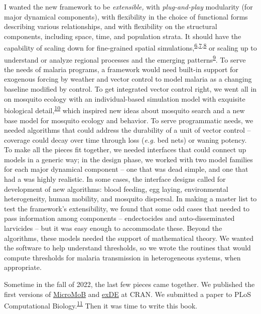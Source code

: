 \documentclass[
]{book}
\begin{document}
I wanted the new framework to be \emph{extensible,} with \emph{plug-and-play} modularity (for major dynamical components), with flexibility in the choice of functional forms describing various relationships, and with flexibility on the structural components, including space, time, and population strata.
It should have the capability of scaling down for fine-grained spatial simulations,\textsuperscript{\protect\hyperlink{ref-CarterR2002SpatialSimulation}{6},\protect\hyperlink{ref-GuW2003IndividualbasedModel}{7},\protect\hyperlink{ref-PerkinsTA2013HeterogeneityMixing}{8}} or scaling up to understand or analyze regional processes and the emerging patterns\textsuperscript{\protect\hyperlink{ref-TatemAJ2010InternationalPopulation}{9}}.
To serve the needs of malaria programs, a framework would need built-in support for exogenous forcing by weather and vector control to model malaria as a changing baseline modified by control.
To get integrated vector control right, we went all in on mosquito ecology with an individual-based simulation model with exquisite biological detail,\textsuperscript{\protect\hyperlink{ref-WuSL2020MBITES}{10}} which inspired new ideas about mosquito search and a new base model for mosquito ecology and behavior.
To serve programmatic needs, we needed algorithms that could address the durability of a unit of vector control -- coverage could decay over time through loss (\emph{e.g.} bed nets) or waning potency.
To make all the pieces fit together, we needed interfaces that could connect up models in a generic way; in the design phase, we worked with two model families for each major dynamical component -- one that was dead simple, and one that had a was highly realistic.
In some cases, the interface designs called for development of new algorithms: blood feeding, egg laying, environmental heterogeneity, human mobility, and mosquito dispersal.
In making a master list to test the framework's extensibility, we found that some odd cases that needed to pass information among components -- endectocides and auto-disseminated larvicides -- but it was easy enough to accommodate these.
Beyond the algorithms, these models needed the support of mathematical theory.
We wanted the software to help understand thresholds, so we wrote the routines that would compute thresholds for malaria transmission in heterogeneous systems, when appropriate.

Sometime in the fall of 2022, the last few pieces came together. We published the first versions of \href{https://cran.r-project.org/package=MicroMoB}{MicroMoB} and \href{https://CRAN.R-project.org/package=exDE}{exDE} at CRAN. We submitted a paper to PLoS Computational Biology.\textsuperscript{\protect\hyperlink{ref-WuSL2023SpatialDynamics}{11}}
Then it was time to write this book.
\end{document}
